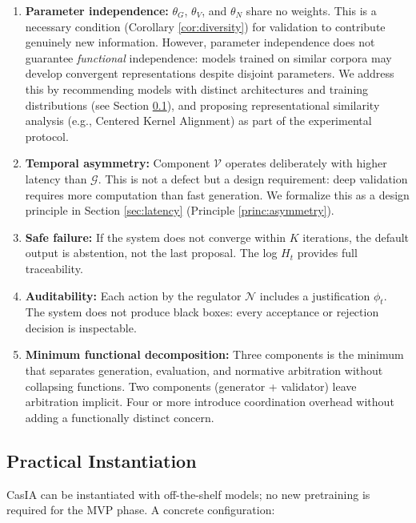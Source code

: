 \documentclass[11pt,a4paper]{article}
\theoremstyle{remark}
\begin{document}
\begin{enumerate}
  \item \textbf{Parameter independence:} $\theta_G$, $\theta_V$, and $\theta_N$ share no weights. This is a necessary condition (Corollary \ref{cor:diversity}) for validation to contribute genuinely new information. However, parameter independence does not guarantee \emph{functional} independence: models trained on similar corpora may develop convergent representations despite disjoint parameters. We address this by recommending models with distinct architectures and training distributions (see Section \ref{sec:practical}), and proposing representational similarity analysis (e.g., Centered Kernel Alignment) as part of the experimental protocol.
  
  \item \textbf{Temporal asymmetry:} Component $\mathcal{V}$ operates deliberately with higher latency than $\mathcal{G}$. This is not a defect but a design requirement: deep validation requires more computation than fast generation. We formalize this as a design principle in Section \ref{sec:latency} (Principle \ref{princ:asymmetry}).
  
  \item \textbf{Safe failure:} If the system does not converge within $K$ iterations, the default output is abstention, not the last proposal. The log $H_t$ provides full traceability.
  
  \item \textbf{Auditability:} Each action by the regulator $\mathcal{N}$ includes a justification $\phi_t$. The system does not produce black boxes: every acceptance or rejection decision is inspectable.
  
  \item \textbf{Minimum functional decomposition:} Three components is the minimum that separates generation, evaluation, and normative arbitration without collapsing functions. Two components (generator + validator) leave arbitration implicit. Four or more introduce coordination overhead without adding a functionally distinct concern.
\end{enumerate}

\subsection{Practical Instantiation}
\label{sec:practical}

CasIA can be instantiated with off-the-shelf models; no new pretraining is required for the MVP phase. A concrete configuration:
\end{document}
